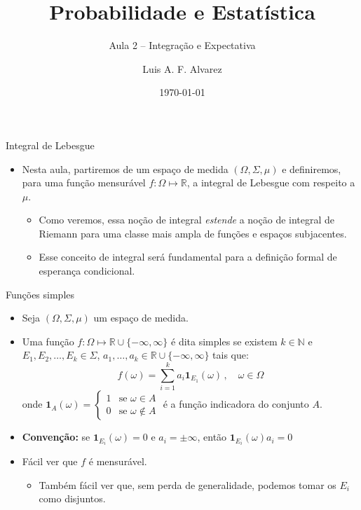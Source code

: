 \documentclass[11pt]{beamer}
\author{Luis A. F. Alvarez}
\title{Probabilidade e Estatística}
\subtitle{Aula 2 -- Integração e Expectativa}
\date{\today}
\begin{document}
	
	\maketitle
\begin{frame}{Integral de Lebesgue}
	\begin{itemize}
		\item Nesta  aula, partiremos de um espaço de medida $(\Omega, \Sigma,\mu)$ e definiremos, para uma função mensurável $f: \Omega \mapsto \mathbb{R}$, a integral de Lebesgue com respeito a $\mu$.
		\begin{itemize}
			\item Como veremos, essa noção de integral \emph{estende} a noção de integral de Riemann para uma classe mais ampla de funções e espaços subjacentes.
			\item Esse conceito de integral será fundamental para a definição formal de esperança condicional.
		\end{itemize}
	\end{itemize}
\end{frame}

\begin{frame}{Funções simples}
	\begin{itemize}
	\item Seja $(\Omega, \Sigma, \mu)$ um espaço de medida.
	\item Uma função $f:\Omega \mapsto \mathbb{R} \cup \{-\infty,\infty\}$ é dita simples se existem $k \in \mathbb{N}$ e $E_1, E_2,\ldots, E_k \in \Sigma$, $a_1,\ldots, a_k \in \mathbb{R}\cup \{-\infty,\infty\}$ tais que:
		$$f(\omega) = \sum_{i=1}^k a_i \mathbf{1}_{E_1}(\omega)\, , \quad \omega \in \Omega$$
		onde $\mathbf{1}_A(\omega) = \begin{cases}
			1 & \text{se } \omega \in A \\
			0 & \text{se } \omega \notin A
		\end{cases}$ é a função indicadora do conjunto $A$.
		\item \textbf{Convenção:} se $\mathbf{1}_{E_i}(\omega) =0$ e $a_i = \pm \infty$, então $\mathbf{1}_{E_i}(\omega) a_i = 0$
		\item Fácil ver que $f$ é mensurável.
		\begin{itemize}
			\item Também fácil ver que, sem perda de generalidade, podemos tomar os $E_i$ como disjuntos.
		\end{itemize}
		
	\end{itemize}
	\end{frame}
	
\end{document}
